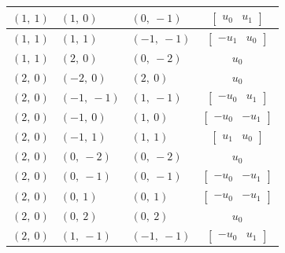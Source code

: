 \documentclass[11pt]{article}
\theoremstyle{definition}
\begin{document}
\begin{longtable}{|l|l|l|c|}
    \hline
    $\left( 1, \  1\right)$ & $\left( 1, \  0\right)$ & $\left( 0, \  -1\right)$ & $\left[\begin{matrix}u_{0} & u_{1}\end{matrix}\right]$ \\
    \hline
    $\left( 1, \  1\right)$ & $\left( 1, \  1\right)$ & $\left( -1, \  -1\right)$ & $\left[\begin{matrix}- u_{1} & u_{0}\end{matrix}\right]$ \\
    \hline
    $\left( 1, \  1\right)$ & $\left( 2, \  0\right)$ & $\left( 0, \  -2\right)$ & $u_{0}$ \\
    \hline
    $\left( 2, \  0\right)$ & $\left( -2, \  0\right)$ & $\left( 2, \  0\right)$ & $u_{0}$ \\
    \hline
    $\left( 2, \  0\right)$ & $\left( -1, \  -1\right)$ & $\left( 1, \  -1\right)$ & $\left[\begin{matrix}- u_{0} & u_{1}\end{matrix}\right]$ \\
    \hline
    $\left( 2, \  0\right)$ & $\left( -1, \  0\right)$ & $\left( 1, \  0\right)$ & $\left[\begin{matrix}- u_{0} & - u_{1}\end{matrix}\right]$ \\
    \hline
    $\left( 2, \  0\right)$ & $\left( -1, \  1\right)$ & $\left( 1, \  1\right)$ & $\left[\begin{matrix}u_{1} & u_{0}\end{matrix}\right]$ \\
    \hline
    $\left( 2, \  0\right)$ & $\left( 0, \  -2\right)$ & $\left( 0, \  -2\right)$ & $u_{0}$ \\
    \hline
    $\left( 2, \  0\right)$ & $\left( 0, \  -1\right)$ & $\left( 0, \  -1\right)$ & $\left[\begin{matrix}- u_{0} & - u_{1}\end{matrix}\right]$ \\
    \hline
    $\left( 2, \  0\right)$ & $\left( 0, \  1\right)$ & $\left( 0, \  1\right)$ & $\left[\begin{matrix}- u_{0} & - u_{1}\end{matrix}\right]$ \\
    \hline
    $\left( 2, \  0\right)$ & $\left( 0, \  2\right)$ & $\left( 0, \  2\right)$ & $u_{0}$ \\
    \hline
    $\left( 2, \  0\right)$ & $\left( 1, \  -1\right)$ & $\left( -1, \  -1\right)$ & $\left[\begin{matrix}- u_{0} & u_{1}\end{matrix}\right]$ \\

\end{longtable}
\end{document}
